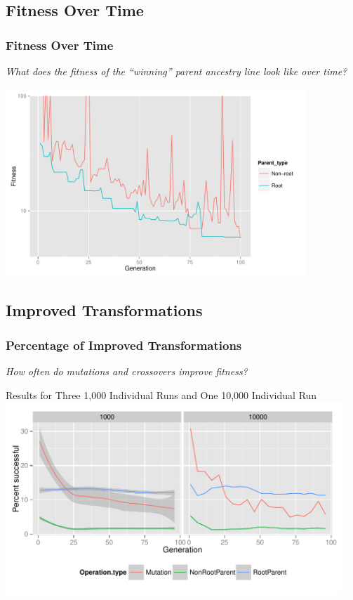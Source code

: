 \documentclass{beamer}
\begin{document}
\subsection[Fitness Graph]{Fitness Over Time}

\begin{frame}
\frametitle{Fitness Over Time}
\emph{What does the fitness of the ``winning'' parent ancestry line look like over time?}
\begin{center}
\includegraphics[width=0.85\textwidth]{Combined_fitness_over_time_no_dashed}
\end{center}
\end{frame}

\subsection[Improved Transformations]{Improved Transformations}

\begin{frame}
\frametitle{Percentage of Improved Transformations}
\emph{How often do mutations and crossovers improve fitness?}
\begin{center}
{\tiny Results for Three 1,000 Individual Runs and One 10,000 Individual Run}
\includegraphics[width=0.95\textwidth]{All_percentages_over_time}
\end{center}
\end{frame}
\end{document}
